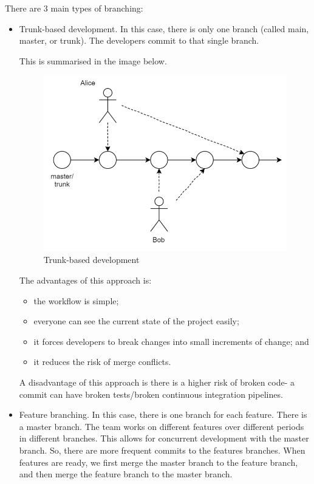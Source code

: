 \documentclass[a4paper, openany]{memoir}
\begin{document}
There are 3 main types of branching:
\begin{itemize}
    \item Trunk-based development. In this case, there is only one branch (called main, master, or trunk). The developers commit to that single branch. 
    
    This is summarised in the image below.
    \begin{figure}[H]
        \centering
        \includegraphics[scale=0.6]{src/3.9 Trunk based.png}
        \caption{Trunk-based development}
    \end{figure}
    The advantages of this approach is:
    \begin{itemize}
        \item the workflow is simple;
        \item everyone can see the current state of the project easily;
        \item it forces developers to break changes into small increments of change; and
        \item it reduces the risk of merge conflicts.
    \end{itemize}
    A disadvantage of this approach is there is a higher risk of broken code- a commit can have broken tests/broken continuous integration pipelines.
    
    \item Feature branching. In this case, there is one branch for each feature. There is a master branch. The team works on different features over different periods in different branches. This allows for concurrent development with the master branch. So, there are more frequent commits to the features branches. When features are ready, we first merge the master branch to the feature branch, and then merge the feature branch to the master branch.
    

\end{itemize}
\end{document}
